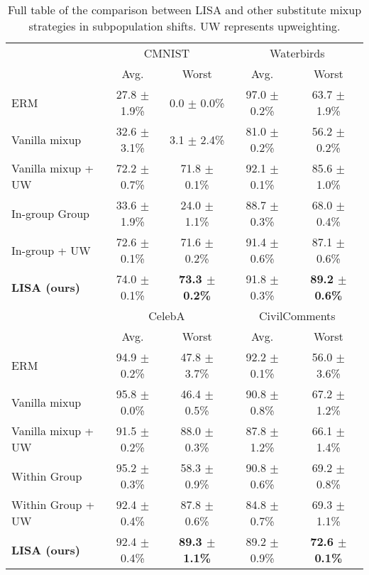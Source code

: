 \begin{table*}[h]
\small
\caption{Full table of the comparison between LISA and other substitute mixup strategies in subpopulation shifts. UW represents upweighting.}
\vspace{-1em}
\label{tab:subpopulation_ablation_full}
\begin{center}
\begin{tabular}{l|cc|cc}
\toprule
\multirow{2}{*}{} & \multicolumn{2}{c|}{CMNIST} & \multicolumn{2}{c}{Waterbirds} \\
& Avg. & Worst  & Avg. & Worst   \\\midrule
ERM & 27.8 $\pm$ 1.9\% & 0.0 $\pm$ 0.0\% & 97.0 $\pm$ 0.2\% & 63.7 $\pm$ 1.9\%\\
Vanilla mixup & 32.6 $\pm$ 3.1\% & 3.1 $\pm$ 2.4\% &  81.0 $\pm$ 0.2\% & 56.2 $\pm$ 0.2\% \\
Vanilla mixup + UW & 72.2 $\pm$ 0.7\% & 71.8 $\pm$ 0.1\% & 92.1 $\pm$ 0.1\% & 85.6 $\pm$ 1.0\% \\
In-group Group & 33.6 $\pm$ 1.9\% & 24.0 $\pm$ 1.1\% & 88.7 $\pm$ 0.3\%  & 68.0 $\pm$ 0.4\% \\
In-group + UW & 72.6 $\pm$ 0.1\% & 71.6 $\pm$ 0.2\% & 91.4 $\pm$ 0.6\% & 87.1 $\pm$ 0.6\% \\
\midrule
\textbf{LISA (ours)} & 74.0 $\pm$ 0.1\% &\textbf{73.3 $\pm$ 0.2\%} & 91.8 $\pm$ 0.3\% & \textbf{89.2 $\pm$ 0.6\%}  \\
\midrule\midrule
& \multicolumn{2}{c|}{CelebA} & \multicolumn{2}{c}{CivilComments} \\
& Avg. & Worst & Avg. & Worst \\\midrule
ERM & 94.9 $\pm$ 0.2\% & 47.8 $\pm$ 3.7\% & 92.2 $\pm$ 0.1\% & 56.0 $\pm$ 3.6\% \\
Vanilla mixup & 95.8 $\pm$ 0.0\% & 46.4 $\pm$ 0.5\% & 90.8 $\pm$ 0.8\% & 67.2 $\pm$ 1.2\% \\
Vanilla mixup + UW & 91.5 $\pm$ 0.2\% & 88.0 $\pm$ 0.3\% & 87.8 $\pm$ 1.2\% & 66.1 $\pm$ 1.4\%  \\
Within Group & 95.2 $\pm$ 0.3\% & 58.3 $\pm$ 0.9\% & 90.8 $\pm$ 0.6\% & 69.2 $\pm$ 0.8\% \\
Within Group + UW & 92.4 $\pm$ 0.4\%  & 87.8 $\pm$ 0.6\% & 84.8 $\pm$ 0.7\% & 69.3 $\pm$ 1.1\% \\
\midrule
\textbf{LISA (ours)} & 92.4 $\pm$ 0.4\% & \textbf{89.3 $\pm$ 1.1\%} & 89.2 $\pm$ 0.9\% & \textbf{72.6 $\pm$ 0.1\%}\\
\bottomrule
\end{tabular}
\end{center}
\end{table*}


